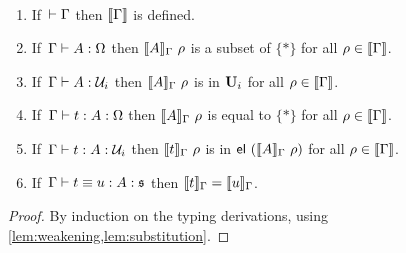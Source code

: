 \begin{theorem}
  \
  \begin{enumerate}
    \item If\, \( \vdash \Gamma \) then \( \llbracket \Gamma \rrbracket \) is defined.
    \item If\, \( \Gamma \vdash A : \Omega \) then \( \llbracket {A} \rrbracket_{\Gamma}\ \rho \) is a subset of \( \{ * \} \) for all \( \rho \in \llbracket \Gamma \rrbracket \).
    \item If\, \( \Gamma \vdash A : \mathcal{U}_i \) then \( \llbracket {A} \rrbracket_{\Gamma}\ \rho \) is in \( \mathbf{U}_i \) for all \( \rho \in \llbracket \Gamma \rrbracket \).
    \item If\, \( \Gamma \vdash t : A : \Omega \) then \( \llbracket {A} \rrbracket_{\Gamma}\ \rho \) is equal to \( \{ * \} \) for all \( \rho \in \llbracket \Gamma \rrbracket \).
    \item If\, \( \Gamma \vdash t : A : \mathcal{U}_i \) then \( \llbracket {t} \rrbracket_{\Gamma}\ \rho \) is in \( \mathsf{el}\ (\llbracket {A} \rrbracket_{\Gamma}\ \rho) \) for all \( \rho \in \llbracket \Gamma \rrbracket \).
    \item If\, \( \Gamma \vdash t \equiv u : A : \mathfrak{s} \) then \( \llbracket {t} \rrbracket_{\Gamma} = \llbracket {u} \rrbracket_{\Gamma} \).
  \end{enumerate}
\end{theorem}
\begin{proof}
  By induction on the typing derivations, using \cref{lem:weakening,lem:substitution}.
\end{proof}


